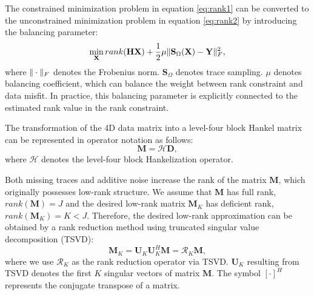 The constrained minimization problem in equation \ref{eq:rank1} can be converted to the unconstrained minimization problem in equation \ref{eq:rank2} by introducing the balancing parameter:
\begin{equation}
\label{eq:rank2}
\min_{\mathbf{X}} rank(\mathbf{H} \mathbf{X}) + \frac{1}{2} \mu \Arrowvert \mathbf{S}_{\Omega}(\mathbf{X}) -\mathbf{Y}\Arrowvert_F^2,
\end{equation}
where $\Arrowvert\cdot\Arrowvert_F$ denotes the Frobenius norm. $\mathbf{S}_{\Omega}$ denotes trace sampling. $\mu$ denotes balancing coefficient, which can balance the weight between rank constraint and data misfit. In practice, this balancing parameter is explicitly connected to the estimated rank value in the rank constraint. 

The transformation of the 4D data matrix into a level-four block Hankel matrix can be represented in operator notation as follows:
\begin{equation}
\label{eq:hankelopt}
\mathbf{M}=\mathcal{H}\mathbf{D},
\end{equation}
where $\mathcal{H}$ denotes the level-four block Hankelization operator. 

Both missing traces and additive noise increase the rank of the matrix $\mathbf{M}$, which originally possesses low-rank structure. We assume that $\mathbf{M}$ has full rank, $rank(\mathbf{M})=J$ and the desired low-rank matrix $\mathbf{M}_K$ has deficient rank, $rank(\mathbf{M}_K)=K<J$. Therefore, the desired low-rank approximation can be obtained by a rank reduction method using truncated singular value decomposition (TSVD):
\begin{equation}
\label{eq:reductionopt}
\mathbf{M}_K=\mathbf{U}_K\mathbf{U}_K^H\mathbf{M}=\mathcal{R}_K\mathbf{M},
\end{equation} 
where we use $\mathcal{R}_K$ as the rank reduction operator via TSVD. $\mathbf{U}_K$ resulting from TSVD denotes the first $K$ singular vectors of matrix $\mathbf{M}$. The symbol $[\cdot]^H$ represents the conjugate transpose of a matrix. 

